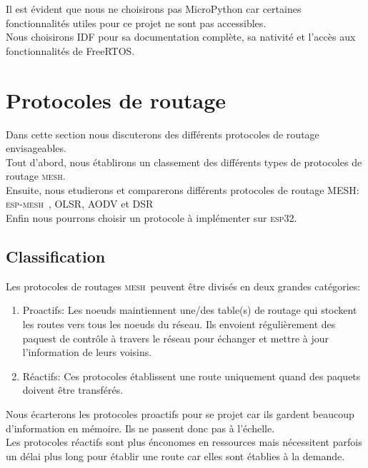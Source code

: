 \documentclass[a4paper, 12pt]{report}
\newcommand{\esp}{\textsc{esp32}}
\newcommand{\espmesh}{\textsc{esp-mesh}}
\newcommand{\mesh}{\textsc{mesh}}
\begin{document}
    Il est évident que nous ne choisirons pas MicroPython car certaines fonctionnalités utiles pour ce projet ne sont pas accessibles.\\
    Nous choisirons IDF pour sa documentation complète, sa nativité et l'accès aux fonctionnalités de FreeRTOS.
\section{Protocoles de routage}
    Dans cette section nous discuterons des différents protocoles de routage envisageables.\\
    Tout d'abord, nous établirons un classement des différents types de protocoles de routage \mesh. \\
    Ensuite, nous etudierons et comparerons différents protocoles de routage MESH: \espmesh\ \cite{esp-mesh_w}, OLSR\cite{olsr_w}, AODV\cite{aodv_w} et DSR\cite{dsr_w}\\
    Enfin nous pourrons choisir un protocole à implémenter sur \esp.\\
    
    \subsection{Classification}
    Les protocoles de routages \mesh\ peuvent être divisés en deux grandes catégories:
    \begin{enumerate}
        \item Proactifs: Les noeuds maintiennent une/des table(s) de routage
            qui stockent les routes vers tous les noeuds du réseau. 
            Ils envoient régulièrement des paquest de contrôle à travers le réseau pour échanger et 
            mettre à jour l'information de leurs voisins.
        \item Réactifs: Ces protocoles établissent une route uniquement quand des paquets
            doivent être transférés.
    \end{enumerate}
    Nous écarterons les protocoles proactifs pour se projet car ils gardent
    beaucoup d'information en mémoire. Ils ne passent donc pas à l'échelle.\\
    Les protocoles réactifs sont plus énconomes en ressources mais nécessitent parfois un délai plus long pour établir une route
    car elles sont établies à la demande.\\
    
\end{document}
